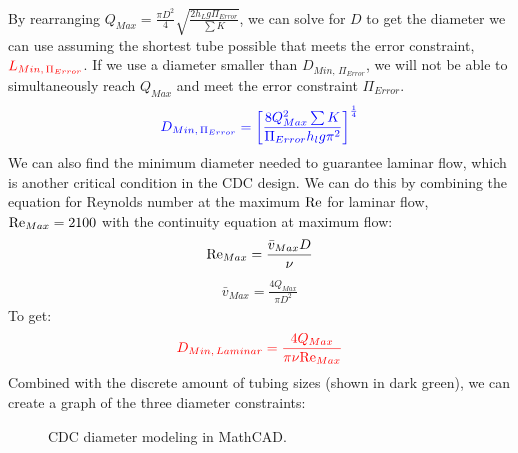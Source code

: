 \documentclass[letterpaper,10pt,english]{sphinxmanual}
\let\sphinxpxdimen\pdfpxdimen\else\newdimen\sphinxpxdimen
\begin{document}
By rearranging \(Q_{Max} = \frac{\pi D^2}{4} \sqrt{\frac{2 h_L g \Pi_{Error}}{\sum K }}\), we can solve for \(D\) to get the  diameter we can use assuming the shortest tube possible that meets the error constraint, \(\color{red}{L_{Min, \, \Pi_{Error}}}\). If we use a diameter smaller than \(D_{Min, \, \Pi_{Error}}\), we will not be able to simultaneously reach \(Q_{Max}\) and meet the error constraint \(\Pi_{Error}\).
\begin{equation}\label{equation:Flow_Control_and_Measurement/FCM_Derivations:Flow_Control_and_Measurement/FCM_Derivations:38}
\begin{split}\color{blue}{
D_{Min, \, \Pi_{Error}} = \left[ \frac{8 Q_{Max}^2 \sum K}{\Pi_{Error} h_l g \pi^2} \right]^{\frac{1}{4}}
}\end{split}
\end{equation}
We can also find the minimum diameter needed to guarantee laminar flow, which is another critical condition in the CDC design. We can do this by combining the equation for Reynolds number at the maximum \(\rm{Re}\) for laminar flow, \({\rm{Re}}_{Max} = 2100\) with the continuity equation at maximum flow:
\begin{equation}\label{equation:Flow_Control_and_Measurement/FCM_Derivations:Flow_Control_and_Measurement/FCM_Derivations:39}
\begin{split}{\rm Re}_{Max}  = \frac{\bar v_{Max} D}{\nu}\end{split}
\end{equation}\begin{equation}\label{equation:Flow_Control_and_Measurement/FCM_Derivations:Flow_Control_and_Measurement/FCM_Derivations:40}
\begin{split}\bar v_{Max} = \frac{4 Q_{Max}}{\pi D^2}\end{split}
\end{equation}
To get:
\begin{equation}\label{equation:Flow_Control_and_Measurement/FCM_Derivations:Flow_Control_and_Measurement/FCM_Derivations:41}
\begin{split}\color{red}{
D_{Min, \, Laminar} = \frac{4 Q_{Max}}{\pi \nu {\rm{Re}}_{Max}}
}\end{split}
\end{equation}
Combined with the discrete amount of tubing sizes (shown in dark green), we can create a graph of the three diameter constraints:

\begin{figure}[htbp]
\centering
\capstart

\noindent\sphinxincludegraphics[width=600\sphinxpxdimen]{{CDC_diameter_model}.png}
\caption{CDC diameter modeling in MathCAD.}\label{\detokenize{Flow_Control_and_Measurement/FCM_Derivations:id8}}\label{\detokenize{Flow_Control_and_Measurement/FCM_Derivations:figure-cdc-diameter-model}}\end{figure}
\end{document}
